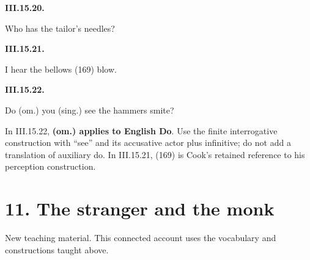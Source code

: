 \par\begin{minipage}{\linewidth}\raggedright
\textbf{III.15.20.}

Who has the tailor’s needles?

\end{minipage}\par\addvspace{4pt}

\par\begin{minipage}{\linewidth}\raggedright
\textbf{III.15.21.}

I hear the bellows (169) blow.

\end{minipage}\par\addvspace{4pt}

\par\begin{minipage}{\linewidth}\raggedright
\textbf{III.15.22.}

Do (om.) you (sing.) see the hammers smite?

In III.15.22, \textbf{(om.) applies to English Do}. Use the finite interrogative construction with “see” and its accusative actor plus infinitive; do not add a translation of auxiliary do. In III.15.21, (169) is Cook's retained reference to his perception construction.

\end{minipage}\par\addvspace{4pt}

\section*{11. The stranger and the monk}

New teaching material. This connected account uses the vocabulary and constructions taught above.

\par\begin{minipage}{\linewidth}\raggedright
{}
\end{minipage}\par

